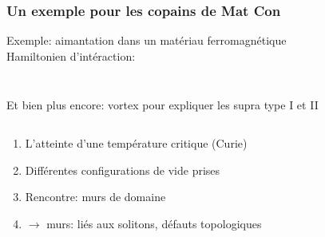 \documentclass[handout]{beamer}
\begin{document}
\begin{frame}
\frametitle{Un exemple pour les copains de Mat Con}
Exemple: aimantation dans un matériau ferromagnétique \\
Hamiltonien d'intéraction: 
\begin{columns}
    \begin{column}{.5\linewidth}
   \begin{figure}[0.3\textwidth]
    \end{figure}
    \end{column}
    \begin{column}{.5\linewidth}
    \begin{figure}[0.3\textwidth]
    \end{figure}
    \end{column}
  \end{columns}
Et bien plus encore: vortex pour expliquer les supra type I et II
\end{frame}

\begin{columns}
\begin{column}{.5\linewidth}
    \begin{enumerate}
    \item L'atteinte d'une température critique (Curie)
    \item Différentes configurations de vide prises
    \item Rencontre: murs de domaine
    \item $\rightarrow$ murs: liés aux solitons, défauts topologiques
    \end{enumerate}
    \end{column}
	\begin{column}{.5\linewidth}
    \begin{figure}[0.3\textwidth]
    \end{figure}
	\end{column}
	
\end{columns}
\end{document}
